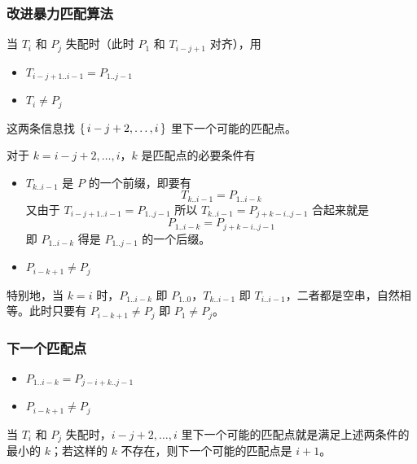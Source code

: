 \documentclass{ctexbeamer}
\begin{document}
\begin{frame}
\frametitle{改进暴力匹配算法}


当 $T_i$ 和 $P_j$ 失配时（此时 $P_1$ 和 $T_{i - j + 1}$ 对齐），用
\begin{itemize}
\item $T_{i - j + 1..i-1} = P_{1..j-1}$
\item $T_i \ne P_j$
\end{itemize}
这两条信息找 $\set{i - j + 2, \dots, i}$ 里下一个可能的匹配点。

对于 $k = i - j + 2, \dots, i$，$k$ 是匹配点的必要条件有
\begin{itemize}
\item $T_{k..i-1}$ 是 $P$ 的一个前缀，即要有 
$$T_{k..i-1} = P_{1..i-k}$$
又由于 $T_{i - j + 1 ..i - 1} = P_{1..j-1}$ 所以 $T_{k..i-1} = P_{j+k-i..j-1}$
合起来就是
$$ P_{1..i-k} = P_{j+k-i..j - 1}$$ 
即 $P_{1..i-k}$ 得是 $P_{1..j-1}$ 的一个后缀。
\item $P_{i - k + 1} \ne P_j$
\end{itemize}
特别地，当 $k=i$ 时，$P_{1..i-k}$ 即 $P_{1..0}$，$T_{k..i-1}$ 即 $T_{i..i-1}$，二者都是空串，自然相等。此时只要有
$P_{i-k+1} \ne P_j$ 即 $P_1 \ne P_j$。
\end{frame}


\begin{frame}
  \frametitle{下一个匹配点}
  \begin{tcolorbox}
    \begin{itemize}
      \item $P_{1..i-k} = P_{j - i+k ..j - 1}$
      \item $P_{i - k + 1} \ne P_j$
      \end{itemize}
      \tcblower
    当 $T_i$ 和 $P_j$ 失配时，$i - j + 2, \dots, i$ 里下一个可能的匹配点就是满足上述两条件的最小的 $k$；若这样的 $k$ 不存在，则下一个可能的匹配点是 $i+1$。
  
  \end{tcolorbox}

\end{frame}
\end{document}
